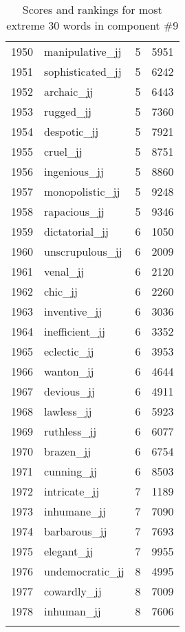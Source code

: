 \begin{longtable}[!htbp]{| rlr@{.}l |}
    1950 & manipulative\_jj & 5 & 5951 \\
    1951 & sophisticated\_jj & 5 & 6242 \\
    1952 & archaic\_jj & 5 & 6443 \\
    1953 & rugged\_jj & 5 & 7360 \\
    1954 & despotic\_jj & 5 & 7921 \\
    1955 & cruel\_jj & 5 & 8751 \\
    1956 & ingenious\_jj & 5 & 8860 \\
    1957 & monopolistic\_jj & 5 & 9248 \\
    1958 & rapacious\_jj & 5 & 9346 \\
    1959 & dictatorial\_jj & 6 & 1050 \\
    1960 & unscrupulous\_jj & 6 & 2009 \\
    1961 & venal\_jj & 6 & 2120 \\
    1962 & chic\_jj & 6 & 2260 \\
    1963 & inventive\_jj & 6 & 3036 \\
    1964 & inefficient\_jj & 6 & 3352 \\
    1965 & eclectic\_jj & 6 & 3953 \\
    1966 & wanton\_jj & 6 & 4644 \\
    1967 & devious\_jj & 6 & 4911 \\
    1968 & lawless\_jj & 6 & 5923 \\
    1969 & ruthless\_jj & 6 & 6077 \\
    1970 & brazen\_jj & 6 & 6754 \\
    1971 & cunning\_jj & 6 & 8503 \\
    1972 & intricate\_jj & 7 & 1189 \\
    1973 & inhumane\_jj & 7 & 7090 \\
    1974 & barbarous\_jj & 7 & 7693 \\
    1975 & elegant\_jj & 7 & 9955 \\
    1976 & undemocratic\_jj & 8 & 4995 \\
    1977 & cowardly\_jj & 8 & 7009 \\
    1978 & inhuman\_jj & 8 & 7606 \\
    \hline
    \caption{Scores and rankings for most extreme 30 words in component \#9} \\
\end{longtable}
